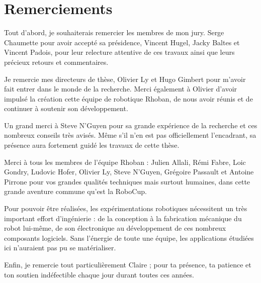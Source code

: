 \documentclass[a4paper,12pt,french]{book}
\author{\BXnom}
\title{\BXsujet}
\theoremstyle{plain}
\theoremstyle{definition}
\begin{document}
\frontmatter

\BXcouverture

\chapter*{Remerciements}

Tout d'abord, je souhaiterais remercier les membres de mon jury.
Serge Chaumette pour avoir accepté sa présidence,
Vincent Hugel, Jacky Baltes et Vincent Padois, 
pour leur relecture attentive de ces travaux ainsi que leurs 
précieux retours et commentaires.
\newline

Je remercie mes directeurs de thèse, Olivier Ly et Hugo Gimbert
pour m'avoir fait entrer dans le monde de la recherche.
Merci également à Olivier d'avoir impulsé la création cette équipe 
de robotique Rhoban, de nous avoir réunis et de continuer à soutenir son développement.
\newline

Un grand merci à Steve N'Guyen pour sa grande expérience de la recherche 
et ces nombreux conseils très avisés.
Même s'il n'en est pas officiellement l'encadrant, 
sa présence aura fortement guidé les travaux de cette thèse.
\newline

Merci à tous les membres de l'équipe Rhoban :
Julien Allali, Rémi Fabre, Loic Gondry, Ludovic Hofer, Olivier Ly,
Steve N'Guyen, Grégoire Passault et Antoine Pirrone
pour vos grandes qualités techniques mais surtout humaines, 
dans cette grande aventure commune qu'est la RoboCup.

Pour pouvoir être réalisées, les expérimentations robotiques nécessitent
un très important effort d'ingénierie : de la conception à la fabrication mécanique
du robot lui-même, de son électronique au développement de ces nombreux composants logiciels.
Sans l'énergie de toute une équipe, les applications étudiées ici n'auraient pas pu se matérialiser.
\newline

Enfin, je remercie tout particulièrement Claire ; pour ta présence, ta patience 
et ton soutien indéfectible chaque jour durant toutes ces années.
\newline

\tableofcontents

\mainmatter
\end{document}
